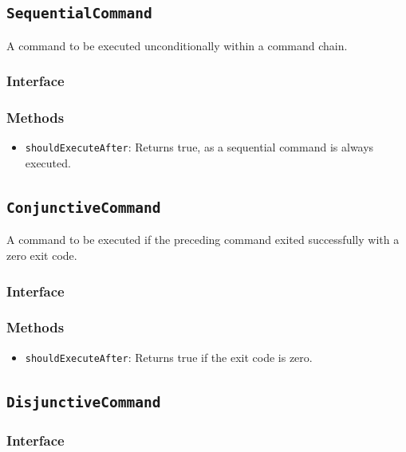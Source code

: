 \documentclass{article}
\begin{document}
  \subsection{\texttt{SequentialCommand}}

  A command to be executed unconditionally within a command chain.

  \subsubsection{Interface}
  

  \subsubsection{Methods}
  \begin{itemize}
    \item \texttt{shouldExecuteAfter}: Returns true, as a sequential
      command is always executed.
  \end{itemize}

  \subsection{\texttt{ConjunctiveCommand}}

  A command to be executed if the preceding command exited successfully
  with a zero exit code.

  \subsubsection{Interface}
  

  \subsubsection{Methods}
  \begin{itemize}
    \item \texttt{shouldExecuteAfter}: Returns true if the exit code is
      zero.
  \end{itemize}

  \subsection{\texttt{DisjunctiveCommand}}

  \subsubsection{Interface}
  
\end{document}
